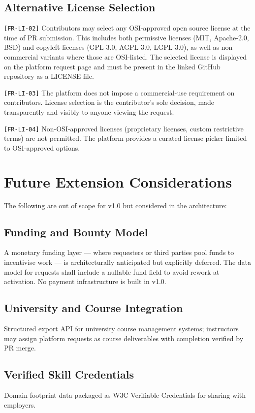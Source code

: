 \documentclass[12pt,a4paper]{article}
\begin{document}
\subsection{Alternative License Selection}
\texttt{[FR-LI-02]} Contributors may select any OSI-approved open source license at the time of PR submission. This includes both permissive licenses (MIT, Apache-2.0, BSD) and copyleft licenses (GPL-3.0, AGPL-3.0, LGPL-3.0), as well as non-commercial variants where those are OSI-listed. The selected license is displayed on the platform request page and must be present in the linked GitHub repository as a LICENSE file.

\texttt{[FR-LI-03]} The platform does not impose a commercial-use requirement on contributors. License selection is the contributor's sole decision, made transparently and visibly to anyone viewing the request.

\texttt{[FR-LI-04]} Non-OSI-approved licenses (proprietary licenses, custom restrictive terms) are not permitted. The platform provides a curated license picker limited to OSI-approved options.

\section{Future Extension Considerations}
The following are out of scope for v1.0 but considered in the architecture:

\subsection{Funding and Bounty Model}
A monetary funding layer --- where requesters or third parties pool funds to incentivise work --- is architecturally anticipated but explicitly deferred. The data model for requests shall include a nullable fund field to avoid rework at activation. No payment infrastructure is built in v1.0.

\subsection{University and Course Integration}
Structured export API for university course management systems; instructors may assign platform requests as course deliverables with completion verified by PR merge.

\subsection{Verified Skill Credentials}
Domain footprint data packaged as W3C Verifiable Credentials for sharing with employers.
\end{document}
